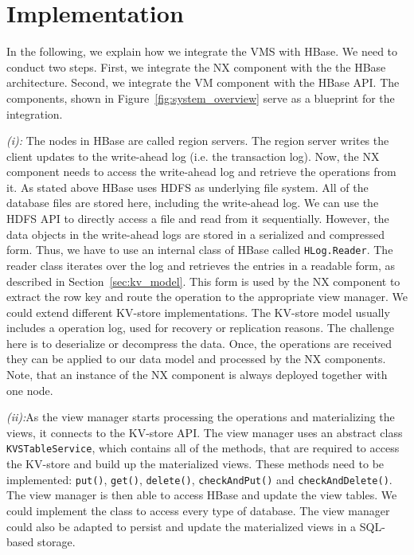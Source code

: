 \section{Implementation}
\label{implementation}


In the following, we explain how we integrate the VMS with HBase. We 
need to conduct two steps. First, we integrate the NX component with the 
the HBase architecture. Second, we integrate the VM component with the 
HBase API. The components, shown in Figure~\ref{fig:system_overview} 
serve as a blueprint for the integration. 

\noindent
\textit{(i):} The nodes in HBase are called region servers. The region 
server writes the client updates to the write-ahead log (i.e. the 
transaction log). Now, the NX component needs to access the write-ahead 
log and retrieve the operations from it. As stated above HBase uses HDFS 
as underlying file system. All of the database files are stored here, 
including the write-ahead log. We can use the HDFS API to directly 
access a file and read from it sequentially. However, the data objects 
in the write-ahead logs are stored in a serialized and compressed form. 
Thus, we have to use an internal class of HBase called 
\texttt{HLog.Reader}. The reader class iterates over the log and 
retrieves the entries in a readable form, as described in 
Section~\ref{sec:kv_model}. This form is used by the NX component to 
extract the row key and route the operation to the appropriate view 
manager. We could extend different KV-store implementations. The 
KV-store model usually includes a operation log, used for recovery or 
replication reasons. The challenge here is to deserialize or decompress 
the data. Once, the operations are received they can be applied to our 
data model and processed by the NX components. Note, that an instance of 
the NX component is always deployed together with one node. 

\noindent
\textit{(ii):}As the view manager starts processing the operations and 
materializing the views, it connects to the KV-store API. The view 
manager uses an abstract class \texttt{KVSTableService}, which contains 
all of the methods, that are required to access the KV-store and build 
up the materialized views. These methods need to be implemented: 
\texttt{put()}, \texttt{get()}, \texttt{delete()}, 
\texttt{checkAndPut()} and \texttt{checkAndDelete()}. The view manager 
is then able to access HBase and update the view tables. We could 
implement the class to access every type of database. The view manager 
could also be adapted to persist and update the materialized views in a 
SQL-based storage. 

